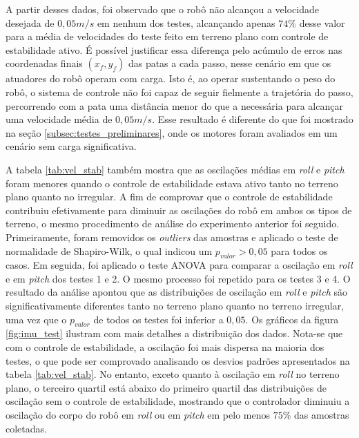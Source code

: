 \documentclass[../main.tex]{subfiles}
\begin{document}
  A partir desses dados, foi observado que o robô não alcançou a velocidade desejada de $0,05 m/s$ em nenhum dos testes, alcançando apenas $74\%$ desse valor para a média de velocidades do teste feito em terreno plano com controle de estabilidade ativo. É possível justificar essa diferença pelo acúmulo de erros nas coordenadas finais $(x_f, y_f)$ das patas a cada passo, nesse cenário em que os atuadores do robô operam com carga. Isto é, ao operar sustentando o peso do robô, o sistema de controle não foi capaz de seguir fielmente a trajetória do passo, percorrendo com a pata uma distância menor do que a necessária para alcançar uma velocidade média de $0,05 m/s$. Esse resultado é diferente do que foi mostrado na seção \ref{subsec:testes_preliminares}, onde os motores foram avaliados em um cenário sem carga significativa.
  
  A tabela \ref{tab:vel_stab} também mostra que as oscilações médias em \textit{roll} e \textit{pitch} foram menores quando o controle de estabilidade estava ativo tanto no terreno plano quanto no irregular. A fim de comprovar que o controle de estabilidade contribuiu efetivamente para diminuir as oscilações do robô em ambos os tipos de terreno, o mesmo procedimento de análise do experimento anterior foi seguido. Primeiramente, foram removidos os \textit{outliers} das amostras e aplicado o teste de normalidade de Shapiro-Wilk, o qual indicou um $p_{valor} > 0,05$ para todos os casos. Em seguida, foi aplicado o teste ANOVA para comparar a oscilação em \textit{roll} e em \textit{pitch} dos testes 1 e 2. O mesmo processo foi repetido para os testes 3 e 4. O resultado da análise apontou que as distribuições de oscilação em \textit{roll} e \textit{pitch} são significativamente diferentes tanto no terreno plano quanto no terreno irregular, uma vez que o $p_{valor}$ de todos os testes foi inferior a $0,05$. Os gráficos da figura \ref{fig:imu_test} ilustram com mais detalhes a distribuição dos dados. Nota-se que com o controle de estabilidade, a oscilação foi mais dispersa na maioria dos testes, o que pode ser comprovado analisando os desvios padrões apresentados na tabela \ref{tab:vel_stab}. No entanto, exceto quanto à oscilação em \textit{roll} no terreno plano, o terceiro quartil está abaixo do primeiro quartil das distribuições de oscilação sem o controle de estabilidade, mostrando que o controlador diminuiu a oscilação do corpo do robô em \textit{roll} ou em \textit{pitch} em pelo menos $75\%$ das amostras coletadas.

\end{document}
